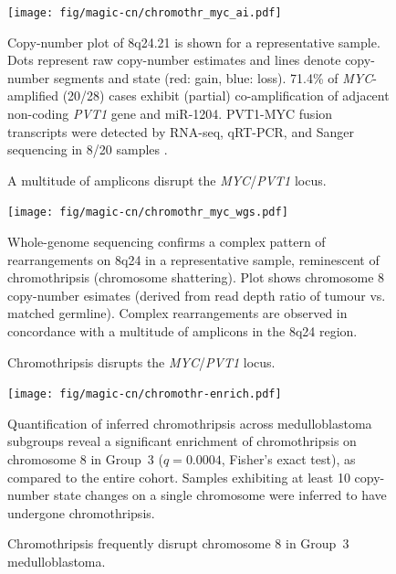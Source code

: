 \documentclass[11pt,letterpaper]{article}
\theoremstyle{definition}
\begin{document}


\begin{figure}[h]
	\begin{center}
		\texttt{[image: fig/magic-cn/chromothr\_myc\_ai.pdf]}
	\end{center}
	\caption{A multitude of amplicons disrupt the \emph{MYC}/\emph{PVT1} locus.}
	Copy-number plot of 8q24.21 is shown for a representative sample. Dots represent raw copy-number estimates and lines denote copy-number segments and state (red: gain, blue: loss). 71.4\% of \emph{MYC}-amplified (20/28) cases exhibit (partial) co-amplification of adjacent non-coding \emph{PVT1} gene and miR-1204. PVT1-MYC fusion transcripts were detected by RNA-seq, qRT-PCR, and Sanger sequencing in 8/20 samples .
	\label{fig:chromothr_myc}
\end{figure}

\begin{figure}[h]
	\begin{center}
		\texttt{[image: fig/magic-cn/chromothr\_myc\_wgs.pdf]}
	\end{center}
	\caption{Chromothripsis disrupts the \emph{MYC}/\emph{PVT1} locus.}
	Whole-genome sequencing confirms a complex pattern of rearrangements on 8q24 in a representative sample, reminescent of chromothripsis (chromosome shattering).
	Plot shows chromosome 8 copy-number esimates (derived from read depth ratio of tumour vs. matched germline).
	Complex rearrangements are observed in concordance with a multitude of amplicons in the 8q24 region.
	\label{fig:chromothr_myc_wgs}
\end{figure}

\begin{figure}[h]
	\begin{center}
		\texttt{[image: fig/magic-cn/chromothr-enrich.pdf]}
	\end{center}
	\caption{Chromothripsis frequently disrupt chromosome 8 in Group~3 medulloblastoma.}
	Quantification of inferred chromothripsis across medulloblastoma subgroups reveal a significant enrichment of chromothripsis on chromosome 8 in Group~3 ($q = 0.0004$, Fisher's exact test), as compared to the entire cohort. Samples exhibiting at least 10 copy-number state changes on a single chromosome were inferred to have undergone chromothripsis.
	\label{fig:chromothr-enrich}
\end{figure}
\end{document}

